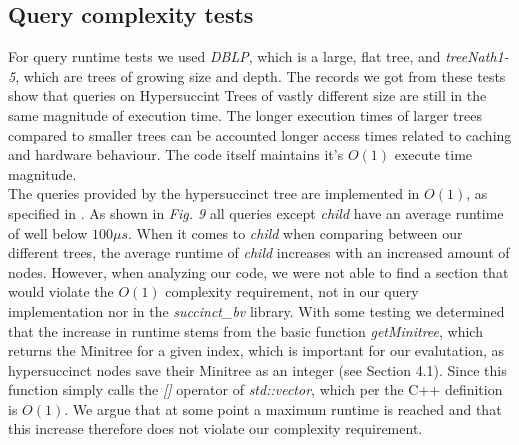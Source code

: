 \documentclass{article}
\begin{document}
\subsection{Query complexity tests}
For query runtime tests we used \textit{DBLP}, which is a large, flat tree, and \textit{treeNath1-5}, which are trees of growing size and depth. The records we got from these tests show that queries on Hypersuccint Trees of vastly different size are still in the same magnitude of execution time. The longer execution times of larger trees compared to smaller trees can be accounted longer access times related to caching and hardware behaviour. The code itself maintains it's $O(1)$ execute time magnitude.\\
The queries provided by the hypersuccinct tree are implemented in $O(1)$, as specified in
\cite{farzanMunro}. As shown in \textit{Fig. 9} all queries except \textit{child} have an average runtime of well below $100 \mu s$. When it comes to \textit{child} when comparing between our different trees, the average runtime of \textit{child} increases with an increased amount of nodes. However, when analyzing our code, we were not able to find a section that would violate the $O(1)$ complexity requirement, not in our query implementation nor in the \textit{succinct\_bv} library. With some testing we determined that the increase in runtime stems from the basic function \textit{getMinitree}, which returns the Minitree for a given index, which is important for our evalutation, as hypersuccinct nodes save their Minitree as an integer (see Section 4.1).
Since this function simply calls the \textit{[]} operator of \textit{std::vector}, which per the C++ definition is $O(1)$. We argue that at some point a maximum runtime is reached and that this increase therefore does not violate our complexity requirement.
\end{document}
